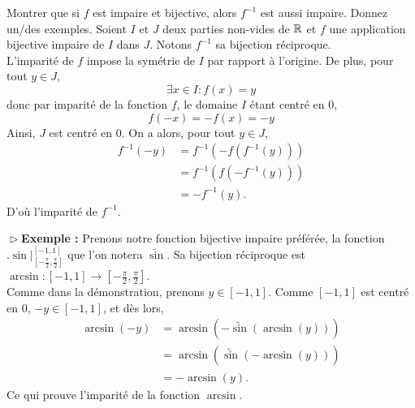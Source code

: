 \documentclass{article}
\renewenvironment{question_kholle}[2][ ]
{
	\subsection{\texorpdfstring{#2}{}}
	\notblank{#1}
	{
		\noindent #1
		\bigbreak
	}
	{}
	\begin{proof}
}
{
	\end{proof}
}
\begin{document}
\begin{question_kholle}{Montrer que si $f$ est impaire et bijective, alors $f^{-1}$ est aussi impaire. Donnez un/des exemples.}
	Soient $I$ et $J$ deux parties non-vides de $\mathbb R$ et $f$ une application bijective impaire de $I$ dans $J$. Notons $f^{-1}$ sa bijection réciproque.\\
	L'imparité de $f$ impose la symétrie de $I$ par rapport à l'origine. De plus, pour tout $y\in J$,
	\[
		\exists{x}\in I: f(x)=y
	\]
	donc par imparité de la fonction $f$, le domaine $I$ étant centré en $0$,
	\[
		f(-x)=-f(x)=-y
	\]
	Ainsi, $J$ est centré en $0$. On a alors, pour tout $y\in J$,
	\begin{align*}
		f^{-1}(-y) & = f^{-1}(-f(f^{-1}(y))) \\
		           & = f^{-1}(f(-f^{-1}(y))) \\
		           & = -f^{-1}(y).
	\end{align*}
	D'où l'imparité de $f^{-1}$.

	\noindent $\vartriangleright$\textbf{Exemple :} Prenons notre fonction bijective impaire préférée, la fonction $\bigl.\sin\bigr|_{\left[ -\frac{\pi}{2}, \frac{\pi}{2}\right]}^{[-1,1]}$ que l'on notera $\widetilde{\sin}$. Sa bijection réciproque est $\arcsin : [-1,1] \to \left[ -\frac{\pi}{2}, \frac{\pi}{2}\right]$.\\
	Comme dans la démonstration, prenons $y\in [-1, 1]$. Comme $[-1,1]$ est centré en $0$, $-y\in [-1,1]$, et dès lors,
	\begin{align*}
		\arcsin(-y) & = \arcsin(-\widetilde{\sin}(\arcsin(y))) \\
		            & = \arcsin(\widetilde{\sin}(-\arcsin(y))) \\
		            & = -\arcsin(y).
	\end{align*}
	Ce qui prouve l'imparité de la fonction $\arcsin$.
\end{question_kholle}
\end{document}
